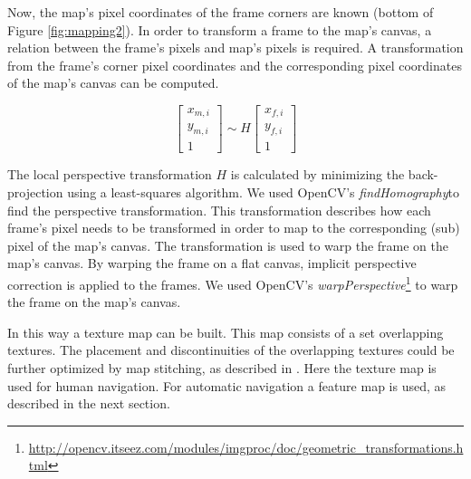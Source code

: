 Now, the map's pixel coordinates of the frame corners are known (bottom of Figure \ref{fig:mapping2}).
In order to transform a frame to the map's canvas, a relation between the frame's pixels and map's pixels is required.
A transformation from the frame's corner pixel coordinates and the corresponding pixel coordinates of the map's canvas can be computed.

\begin{equation}
\label{eq:visual-slam-perspective-transformation}
\left[ {
\begin{array}{c} x_{m,i} \\ y_{m,i} \\ 1 \end{array}
} \right]
\sim
H
\left[ {
\begin{array}{c} x_{f,i} \\ y_{f,i} \\ 1 \end{array}
} \right]
\end{equation}

The local perspective transformation $H$ is calculated by minimizing the back-projection using a least-squares algorithm.
We used OpenCV's \textit{findHomography}\footnotemark[3] to find the perspective transformation.
This transformation describes how each frame's pixel needs to be transformed in order to map to the corresponding (sub) pixel of the map's canvas.
The transformation is used to warp the frame on the map's canvas.
By warping the frame on a flat canvas, implicit perspective correction is applied to the frames.
We used OpenCV's \textit{warpPerspective}\footnote{\url{http://opencv.itseez.com/modules/imgproc/doc/geometric_transformations.html}} to warp the frame on the map's canvas.

In this way a texture map can be built. This map consists of a set overlapping textures. The placement and discontinuities of the overlapping textures could be further optimized by map stitching, as described in \cite{Visser2011imav}. Here the texture map is used for human navigation. For automatic navigation a feature map is used, as described in the next section.



